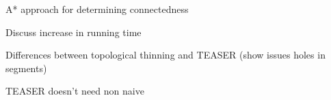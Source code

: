 A* approach for determining connectedness

Discuss increase in running time

Differences between topological thinning and TEASER (show issues  holes in segments)

TEASER doesn't need non naive











